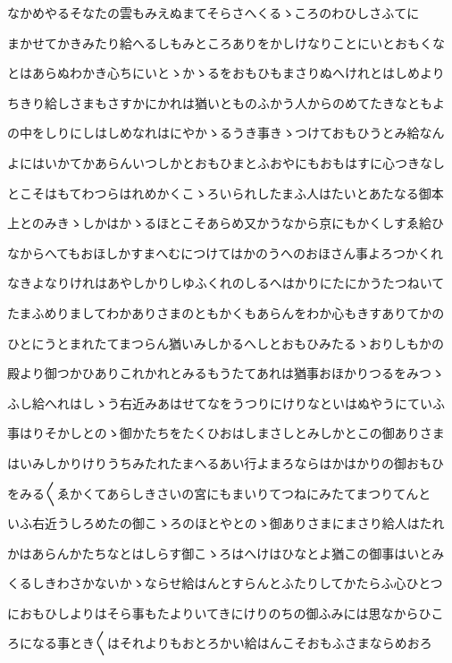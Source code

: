 \documentclass[a4paper,11pt,landscape]{ltjtarticle}
\begin{document}
なかめやるそなたの雲もみえぬまてそらさへくるゝころのわひしさふてに
\par\medskip
まかせてかきみたり給へるしもみところありをかしけなりことにいとおもくな
\par\medskip
とはあらぬわかき心ちにいとゝかゝるをおもひもまさりぬへけれとはしめより
\par\medskip
ちきり給しさまもさすかにかれは猶いとものふかう人からのめてたきなともよ
\par\medskip
の中をしりにしはしめなれはにやかゝるうき事きゝつけておもひうとみ給なん
\par\medskip
よにはいかてかあらんいつしかとおもひまとふおやにもおもはすに心つきなし
\par\medskip
とこそはもてわつらはれめかくこゝろいられしたまふ人はたいとあたなる御本
\par\medskip
上とのみきゝしかはかゝるほとこそあらめ又かうなから京にもかくしすゑ給ひ
\par\medskip
なからへてもおほしかすまへむにつけてはかのうへのおほさん事よろつかくれ
\par\medskip
なきよなりけれはあやしかりしゆふくれのしるへはかりにたにかうたつねいて
\par\medskip
たまふめりましてわかありさまのともかくもあらんをわか心もきすありてかの
\par\medskip
ひとにうとまれたてまつらん猶いみしかるへしとおもひみたるゝおりしもかの
\par\medskip
殿より御つかひありこれかれとみるもうたてあれは猶事おほかりつるをみつゝ
\par\medskip
ふし給へれはしゝう右近みあはせてなをうつりにけりなといはぬやうにていふ
\par\medskip
事はりそかしとのゝ御かたちをたくひおはしまさしとみしかとこの御ありさま
\par\medskip
はいみしかりけりうちみたれたまへるあい行よまろならはかはかりの御おもひ
\par\medskip
をみる〱ゑかくてあらしきさいの宮にもまいりてつねにみたてまつりてんと
\par\medskip
いふ右近うしろめたの御こゝろのほとやとのゝ御ありさまにまさり給人はたれ
\par\medskip
かはあらんかたちなとはしらす御こゝろはへけはひなとよ猶この御事はいとみ
\par\medskip
くるしきわさかないかゝならせ給はんとすらんとふたりしてかたらふ心ひとつ
\par\medskip
におもひしよりはそら事もたよりいてきにけりのちの御ふみには思なからひこ
\par\medskip
ろになる事とき〱はそれよりもおとろかい給はんこそおもふさまならめおろ
\end{document}
